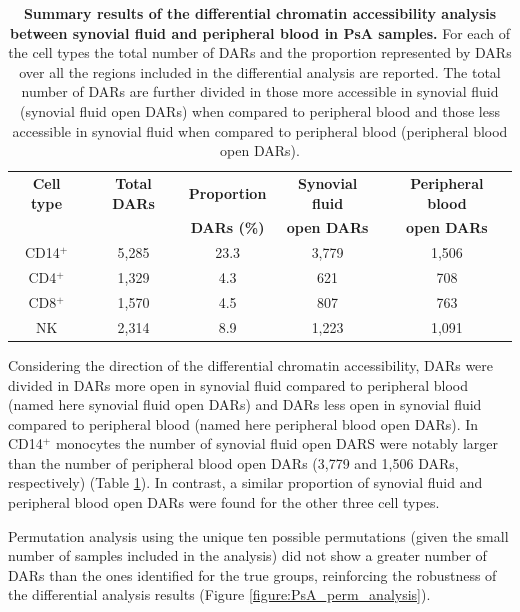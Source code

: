 \begin{table}[htbp]
\centering
\begin{tabular}{@{}c c c c c}
\toprule
\textbf{Cell type}  & \textbf{Total DARs} &  \textbf{Proportion}  & \textbf{Synovial fluid } & \textbf{Peripheral blood} \\
                    &                     &  \textbf{DARs (\%)}  & \textbf{open DARs} & \textbf{open DARs} \\
\midrule
\midrule
CD14$^+$ & 5,285 & 23.3 & 3,779 & 1,506 \\
CD4$^+$  & 1,329 & 4.3 & 621 & 708 \\
CD8$^+$  & 1,570 & 4.5 & 807 & 763 \\
NK       & 2,314 & 8.9 & 1,223 & 1,091 \\
\bottomrule
\end{tabular}
\medskip %
\caption[Summary results of the differential chromatin accessibility analysis between synovial fluid and peripheral blood in PsA samples.]{\textbf{Summary results of the differential chromatin accessibility analysis between synovial fluid and peripheral blood in PsA samples.} For each of the cell types the total number of DARs and the proportion represented by DARs over all the regions included in the differential analysis are reported. The total number of DARs are further divided in those more accessible in synovial fluid (synovial fluid open DARs) when compared to peripheral blood and those less accessible in synovial fluid when compared to peripheral blood (peripheral blood open DARs).}
\label{tab:PSA_DOCs_results}
\end{table}

Considering the direction of the differential chromatin accessibility, DARs were divided in DARs more open in synovial fluid compared to peripheral blood (named here synovial fluid open DARs) and DARs less open in synovial fluid compared to peripheral blood (named here peripheral blood open DARs). In CD14$^+$ monocytes the number of synovial fluid open DARS were notably larger than the number of peripheral blood open DARs (3,779 and 1,506 DARs, respectively) (Table \ref{tab:PSA_DOCs_results}). In contrast, a similar proportion of synovial fluid and peripheral blood open DARs were found for the other three cell types.

Permutation analysis using the unique ten possible permutations (given the small number of samples included in the analysis) did not show a greater number of DARs than the ones identified for the true groups, reinforcing the robustness of the differential analysis results (Figure \ref{figure:PsA_perm_analysis}).


